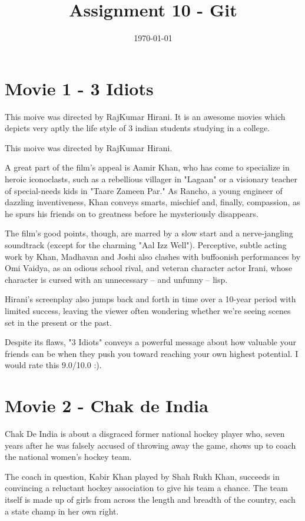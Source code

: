 \documentclass[]{article}
\title{Assignment 10 - Git}
\date{\today}
\begin{document}
\maketitle
\section{Movie 1 - 3 Idiots}
This moive was directed by RajKumar Hirani. It is an awesome movies which depicts very aptly the life style of 3 indian students studying in a college.

This moive was directed by RajKumar Hirani.

A great part of the film's appeal is Aamir Khan, who has come to specialize in heroic iconoclasts, such as a rebellious villager in "Lagaan" or a visionary teacher of special-needs kids in "Taare Zameen Par." As Rancho, a young engineer of dazzling inventiveness, Khan conveys smarts, mischief and, finally, compassion, as he spurs his friends on to greatness before he mysteriously disappears.

The film's good points, though, are marred by a slow start and a nerve-jangling soundtrack (except for the charming "Aal Izz Well"). Perceptive, subtle acting work by Khan, Madhavan and Joshi also clashes with buffoonish performances by Omi Vaidya, as an odious school rival, and veteran character actor Irani, whose character is cursed with an unnecessary -- and unfunny -- lisp.

Hirani's screenplay also jumps back and forth in time over a 10-year period with limited success, leaving the viewer often wondering whether we're seeing scenes set in the present or the past.

Despite its flaws, "3 Idiots" conveys a powerful message about how valuable your friends can be when they push you toward reaching your own highest potential.
I would rate this 9.0/10.0 :).


\section{Movie 2 - Chak de India}
Chak De India is about a disgraced former national hockey player who, seven years after he was falsely accused of throwing away the game, shows up to coach the national women’s hockey team.

The coach in question, Kabir Khan played by Shah Rukh Khan, succeeds in convincing a reluctant hockey association to give his team a chance. The team itself is made up of girls from across the length and breadth of the country, each a state champ in her own right. 
\end{document}
